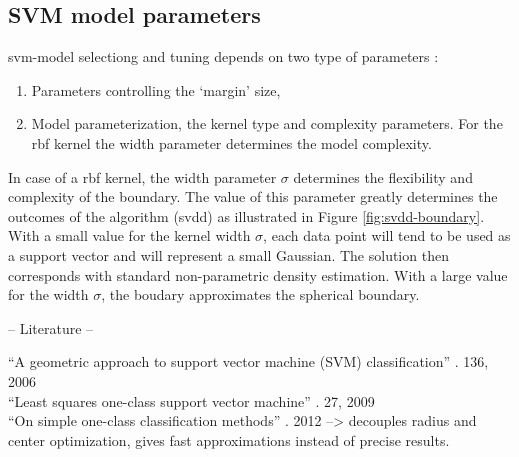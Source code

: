 
\subsection{SVM model parameters}\label{subsec:svm_model_parameters}
\gls{svm}-model selectiong and tuning depends on two type of parameters \cite{cherkassky2007learning}:
\begin{enumerate}
  \item Parameters controlling the `margin' size,
  \item Model parameterization, \eg the kernel type and complexity parameters.
  For the \gls{rbf} kernel the width parameter determines the model complexity.
\end{enumerate}

In case of a \gls{rbf} kernel, the width parameter $\sigma$ determines the flexibility and complexity of the boundary.
The value of this parameter greatly determines the outcomes of the algorithm (\eg \gls{svdd}) as illustrated in Figure \ref{fig:svdd-boundary}.
With a small value for the kernel width $\sigma$, each data point will tend to be used as a support vector and will represent a small Gaussian.
The solution then corresponds with standard non-parametric density estimation.
With a large value for the width $\sigma$, the boudary approximates the spherical boundary.





-- Literature --


``A geometric approach to support vector machine (SVM) classification'' \cite{mavroforakis2006geometric}. 136, 2006 \\

``Least squares one-class support vector machine'' \cite{choi2009least}. 27, 2009 \\

``On simple one-class classification methods'' \cite{noumir2012simple}. 2012  --> decouples radius and center optimization, gives fast approximations instead of precise results. \\